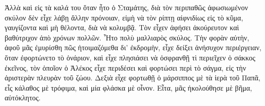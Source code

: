 \documentclass{article}
\begin{document}
\begin{multicols}{3}
Ἀλλὰ καὶ εἰς τὰ καλά του ὅταν ἦτο ὁ Σταμάτης, διὰ τὸν περιπαθῶς
ἀφωσιωμένον σκύλον δὲν εἶχε λάβῃ ἄλλην πρόνοιαν, εἰμὴ νὰ τὸν ρίπτῃ
αἰφνιδίως εἰς τὸ κῦμα, γαυγίζοντα καὶ μὴ θέλοντα, διὰ νὰ κολυμβᾷ. Τὸν
εἶχεν ἀφήσει ἀκούρευτον καὶ βαθύτριχον ἀπὸ χρόνων πολλῶν. Ἦτο πολὺ
μαλλιαρὸς σκύλος. Τὴν φορὰν αὐτὴν, ἀφοῦ μᾶς ἐμυρίσθη πῶς ἡτοιμαζόμεθα
δι’ ἐκδρομὴν, εἶχε δείξει ἀνήσυχον περιέργειαν, ὅταν ἐφορτώνετο τὸ
ὀνάριον, καὶ εἶχε πλησιάσει νὰ ὀσφρανθῇ τὶ περιεῖχεν ὁ σάκκος ἐκεῖνος,
τὸν ὁποῖον ὁ Ἀλέκος εἶχε περιδέσει καὶ φορτώσει περὶ τὸ σάγμα, εἰς τὴν
ἀριστερὰν πλευρὰν τοῦ ζώου. Δεξιὰ εἶχε φορτωθῇ ὁ μάρσιππος μὲ τὰ ἱερὰ
τοῦ Παπᾶ, εἷς κάλαθος μὲ τρόφιμα, καὶ μία φλάσκα μὲ οἶνον. Εἶτα, μᾶς
ἠκολούθησε μὲ βῆμα, αὐτόκλητος.
\end{multicols}
\end{document}
